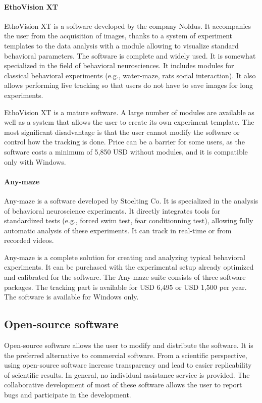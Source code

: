         \paragraph{EthoVision XT}
        EthoVision XT is a software developed by the company Noldus. It accompanies the user from the acquisition of images, thanks to a system of experiment templates to the data analysis with a module allowing to visualize standard behavioral parameters. The software is complete and widely used. It is somewhat specialized in the field of behavioral neurosciences. It includes modules for classical behavioral experiments (e.g., water-maze, rats social interaction). It also allows performing live tracking so that users do not have to save images for long experiments.

        EthoVision XT is a mature software. A large number of modules are available as well as a system that allows the user to create its own experiment template. The most significant disadvantage is that the user cannot modify the software or control how the tracking is done. Price can be a barrier for some users, as the software costs a minimum of 5,850 USD without modules, and it is compatible only with Windows.
        \paragraph{Any-maze}
        Any-maze is a software developed by Stoelting Co. It is specialized in the analysis of behavioral neuroscience experiments. It directly integrates tools for standardized tests (e.g., forced swim test, fear conditionning test), allowing fully automatic analysis of these experiments. It can track in real-time or from recorded videos.

        Any-maze is a complete solution for creating and analyzing typical behavioral experiments. It can be purchased with the experimental setup already optimized and calibrated for the software. The Any-maze suite consists of three software packages. The tracking part is available for USD 6,495 or USD 1,500 per year. The software is available for Windows only.

    \subsection{Open-source software}
    Open-source software allows the user to modify and distribute the software. It is the preferred alternative to commercial software. From a scientific perspective, using open-source software increase transparency and lead to easier replicability of scientific results.
    In general, no individual assistance service is provided. The collaborative development of most of these software allows the user to report bugs and participate in the development.
